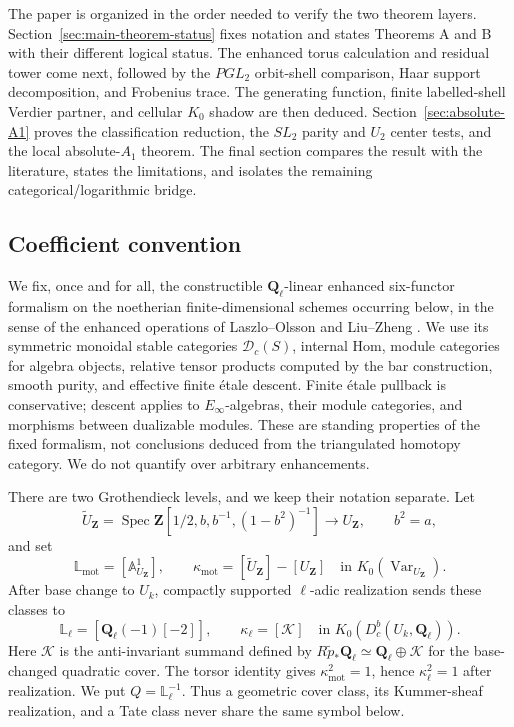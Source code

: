 \documentclass[11pt]{article}
\theoremstyle{definition}
\theoremstyle{remark}
\newcommand{\Qell}{\mathbf Q_\ell}
\newcommand{\Lmot}{\mathbb L_{\mathrm{mot}}}
\newcommand{\Lell}{\mathbb L_{\ell}}
\newcommand{\UZ}{U_{\mathbf Z}}
\newcommand{\Uk}{U_k}
\newcommand{\kappamot}{\kappa_{\mathrm{mot}}}
\newcommand{\kappaell}{\kappa_{\ell}}
\newcommand{\cK}{\mathcal K}
\newcommand{\Spec}{\operatorname{Spec}}
\begin{document}
The paper is organized in the order needed to verify the two theorem layers.
Section~\ref{sec:main-theorem-status} fixes notation and states Theorems A
and B with their different logical status.  The enhanced torus calculation
and residual tower come next, followed by the $PGL_2$ orbit-shell comparison,
Haar support decomposition, and Frobenius trace.  The generating function,
finite labelled-shell Verdier partner, and cellular $K_0$ shadow are then
deduced.  Section~\ref{sec:absolute-A1} proves the classification reduction,
the $SL_2$ parity and $U_2$ center tests, and the local absolute-$A_1$
theorem.  The final section compares the result with the literature, states
the limitations, and isolates the remaining categorical/logarithmic bridge.

\subsection{Coefficient convention}

We fix, once and for all, the constructible $\Qell$-linear enhanced
six-functor formalism on the noetherian finite-dimensional schemes occurring
below, in the sense of the enhanced operations of
Laszlo--Olsson and Liu--Zheng \cite{LaszloOlsson,LiuZhengEnhanced}.
We use its symmetric monoidal stable categories $\mathscr D_c(S)$, internal
Hom, module categories for algebra objects, relative tensor products computed
by the bar construction, smooth purity, and effective finite \'etale descent.
Finite \'etale pullback is conservative; descent applies to $E_\infty$-algebras,
their module categories, and morphisms between dualizable modules.  These are
standing properties of the fixed formalism, not conclusions deduced from the
triangulated homotopy category.  We do not quantify over arbitrary
enhancements.

There are two Grothendieck levels, and we keep their notation separate.  Let
\[
 \widetilde\UZ=\Spec\mathbf Z[1/2,b,b^{-1},(1-b^2)^{-1}]
 \longrightarrow\UZ,\qquad b^2=a,
\]
and set
\[
 \Lmot=[\mathbb A^1_{\UZ}],\qquad
 \kappamot=[\widetilde\UZ]-[\UZ]
 \quad\text{in }K_0(\operatorname{Var}_{\UZ}).
\]
After base change to $\Uk$, compactly supported $\ell$-adic realization sends
these classes to
\[
 \Lell=[\Qell(-1)[-2]],\qquad
 \kappaell=[\cK]
 \quad\text{in }K_0(D_c^b(\Uk,\Qell)).
\]
Here $\cK$ is the anti-invariant summand defined by
$R\widetilde p_*\Qell\simeq\Qell\oplus\cK$ for the base-changed quadratic
cover.  The torsor identity gives $\kappamot^2=1$, hence
$\kappaell^2=1$ after realization.
We put $Q=\Lell^{-1}$.  Thus a geometric cover class, its Kummer-sheaf
realization, and a Tate class never share the same symbol below.
\end{document}
